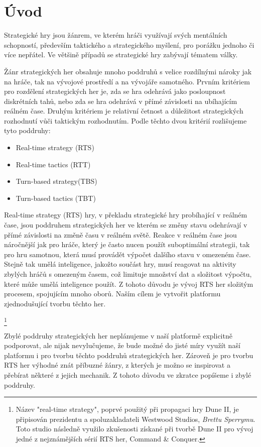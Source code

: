 \chapter{Úvod}

Strategické hry jsou žánrem, ve kterém hráči využívají svých mentálních schopností, především taktického a strategického myšlení, pro porážku jednoho či více nepřátel. Ve většině případů se strategické hry zabývají tématem války. \citep{book:gamefund}

Žánr strategických her obsahuje mnoho poddruhů s velice rozdílnými nároky jak na hráče, tak na vývojové prostředí a na vývojáře samotného. Prvním kritériem pro rozdělení strategických her je, zda se hra odehrává jako posloupnost diskrétních tahů, nebo zda se hra odehrává v přímé závislosti na ubíhajícím reálném čase. Druhým kritériem je relativní četnost a důležitost strategických rozhodnutí vůči taktickým rozhodnutím. Podle těchto dvou kritérií rozlišujeme tyto poddruhy:
\begin{itemize}
	\item Real-time strategy (RTS)
	\item Real-time tactics (RTT)
	\item Turn-based strategy(TBS)
	\item Turn-based tactics (TBT)
\end{itemize}

Real-time strategy (RTS) hry, v překladu strategické hry probíhající v reálném čase, jsou poddruhem strategických her ve kterém se změny stavu odehrávají v přímé závislosti na změně času v reálném světě. Reakce v reálném čase jsou náročnější jak pro hráče, který je často nucen použít suboptimální strategii, tak pro hru samotnou, která musí provádět výpočet dalšího stavu v omezeném čase. Stejně tak umělá inteligence, jakožto součást hry, musí reagovat na aktivity zbylých hráčů s omezeným časem, což limituje množství dat a složitost výpočtu, které může umělá inteligence použít. Z tohoto důvodu je vývoj RTS her složitým procesem, spojujícím mnoho oborů. Naším cílem je vytvořit platformu zjednodušující tvorbu těchto her.

 \footnote{Název "real-time strategy", poprvé použitý při propagaci hry Dune II, je připisován prezidentu a spoluzakladateli Westwood Studios, \emph{Brettu Sperrymu}. Toto studio následně využilo zkušenosti získané při tvorbě Dune II pro vývoj jedné z nejznámějších sérií RTS her, Command \& Conquer.}

Zbylé poddruhy strategických her neplánujeme v naší platformě explicitně podporovat, ale nijak nevylučujeme, že bude možné do jisté míry využít naší platformu i pro tvorbu těchto poddruhů strategických her. Zároveň je pro tvorbu RTS her výhodné znát příbuzné žánry, z kterých je možno se inspirovat a přebírat některé z jejich mechanik. Z tohoto důvodu ve zkratce popíšeme i zbylé poddruhy.

